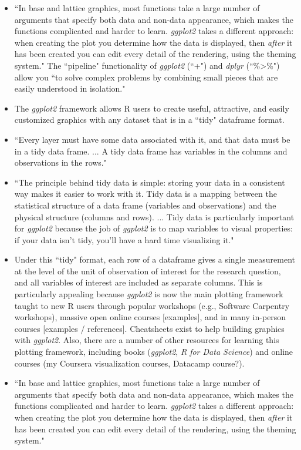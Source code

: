 \documentclass[pdftex,english,11pt,parskip=half]{scrartcl}
\begin{document}
\begin{itemize}
\item ``In base and lattice graphics, most functions take a large number of arguments that specify both data and non-data appearance, which makes the functions complicated and harder to learn. \textit{ggplot2} takes a different approach: when creating the plot you determine how the data is displayed, then \textit{after} it has been created you can edit every detail of the rendering, using the theming system." \cite{wickham2016ggplot2} The ``pipeline" functionality of \textit{ggplot2} (``+") and \textit{dplyr} (``\%>\%") allow you ``to solve complex problems by combining small pieces that are easily understood in isolation." \cite{wickham2016ggplot2} 
\item The \textit{ggplot2} framework allows R users to create useful, attractive, and easily customized graphics with any dataset that is in a ``tidy" dataframe format. 
\item ``Every layer must have some data associated with it, and that data must be in a tidy data frame. ... A tidy data frame has variables in the columns and observations in the rows." \cite{wickham2016ggplot2} 
\item ``The principle behind tidy data is simple: storing your data in a consistent way makes it easier to work with it. Tidy data is a mapping between the statistical structure of a data frame (variables and observations) and the physical structure (columns and rows). ... Tidy data is particularly important for \textit{ggplot2} because the job of \textit{ggplot2} is to map variables to visual properties: if your data isn't tidy, you'll have a hard time visualizing it." \cite{wickham2016ggplot2} 
\item Under this ``tidy" format, each row of a dataframe gives a single measurement at the level of the unit of observation of interest for the research question, and all variables of interest are included as separate columns. This is particularly appealing because \textit{ggplot2} is now the main plotting framework taught to new R users through popular workshops (e.g., Software Carpentry workshops), massive open online courses [examples], and in many in-person courses [examples / references]. Cheatsheets exist to help building graphics with \textit{ggplot2}. Also, there are a number of other resources for learning this plotting framework, including books (\textit{ggplot2}, \textit{R for Data Science}) and online courses (my Coursera visualization courses, Datacamp course?). 
\item ``In base and lattice graphics, most functions take a large number of arguments that specify both data and non-data appearance, which makes the functions complicated and harder to learn. \textit{ggplot2} takes a different approach: when creating the plot you determine how the data is displayed, then \textit{after} it has been created you can edit every detail of the rendering, using the theming system." \cite{wickham2016ggplot2} 

\end{itemize}
\end{document}
